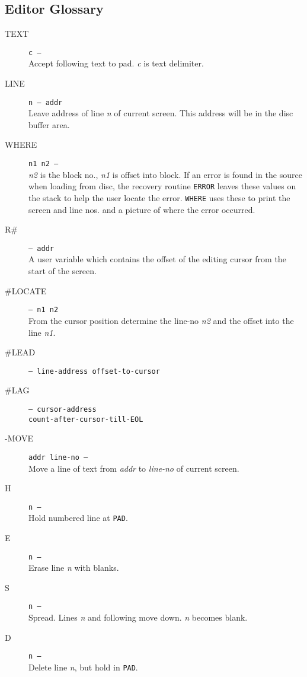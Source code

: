 \documentclass{article}
\newcommand{\n}{\textit{n}}
\begin{document}
\begin{multicols*}{2}[]
	\section{Editor Glossary}
	\begin{description}
		\item[TEXT]\texttt{c ---}\\
			Accept following text to pad. \textit{c} is text delimiter.
		\item[LINE]\texttt{n --- addr}\\
			Leave address of line \n{} of current screen. This address will
			be in the disc buffer area.
		\item[WHERE]\texttt{n1 n2 ---}\\
			\textit{n2} is the block no., \textit{n1} is offset into block.
			If an error is found in the source when loading from disc, the
			recovery routine \verb|ERROR| leaves these values on the stack
			to help the user locate the error. \verb|WHERE| uses these to
			print the screen and line nos. and a picture of where the error
			occurred.
		\item[R\#]\texttt{--- addr}\\
			A user variable which contains the offset of the editing cursor
			from the start of the screen.
		\item[\#LOCATE]\texttt{--- n1 n2}\\
			From the cursor position determine the line-no \textit{n2} and
			the offset into the line \textit{n1}.
		\item[\#LEAD]\texttt{--- line-address offset-to-cursor}
		\item[\#LAG]\texttt{--- cursor-address}\\\texttt{count-after-cursor-till-EOL}
		\item[-MOVE]\texttt{addr line-no ---}\\
			Move a line of text from \textit{addr} to \textit{line-no} of
			current screen.
		\item[H]\texttt{n ---}\\
			Hold numbered line at \verb|PAD|.
		\item[E]\texttt{n ---}\\
			Erase line \n{} with blanks.
		\item[S]\texttt{n ---}\\
			Spread. Lines \n{} and following move down. \n{} becomes blank.
		\item[D]\texttt{n ---}\\
			Delete line \n{}, but hold in \verb|PAD|.

\end{description}
\end{multicols*}
\end{document}
